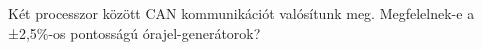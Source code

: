 \begin{example}

Két processzor között CAN kommunikációt valósítunk meg. Megfelelnek-e a ±2,5\%-os pontosságú órajel-generátorok? 

\tcbline
\vspace{1mm}

\solution

\end{example}